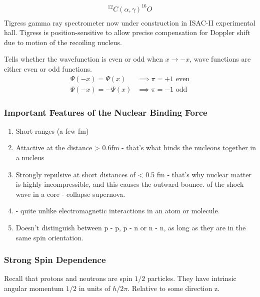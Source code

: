 \documentclass[english, 11pt]{article}
\begin{document}
      \begin{align*}
        ^12C(\alpha,\gamma)^16O\\
      \end{align*}
      Tigress gamma ray spectrometer now under construction in ISAC-II experimental hall. Tigress is position-sensitive to allow precise compensation for Doppler shift due to motion of the recoiling nucleus. 

      \begin{defn}[Parity]
        Tells whether the wavefunction is even or odd when $x \rightarrow -x$, wave functions are either even or odd functions. 
        \begin{align*}
          \Psi(-x) = \Psi(x) &\implies \pi = +1 \text{ even}\\
          \Psi(-x) = -\Psi(x) &\implies \pi = -1 \text{ odd}
        \end{align*}
      \end{defn}

      \subsubsection{Important Features of the Nuclear Binding Force}

      \begin{enumerate}
        \item Short-ranges (a few fm)
        \item Attactive at the distance > 0.6fm - that's what binds the nucleons together in a nucleus
        \item Strongly repulsive at short distances of < 0.5 fm - that's why nuclear matter is highly incompressible, and this causes the outward bounce. of the shock wave in a core - collapse supernova.
        \item {} - quite unlike electromagnetic interactions in an atom or molecule.
        \item Doesn't distinguish between p - p, p - n or n - n, as long as they are in the same spin orientation.
      \end{enumerate}

      \subsubsection{Strong Spin Dependence}\label{ssd}

      Recall that protons and neutrons are spin $1/2$ particles. They have intrinsic angular momentum $1/2$ in units of $h / 2 \pi$. Relative to some direction z.
\end{document}
